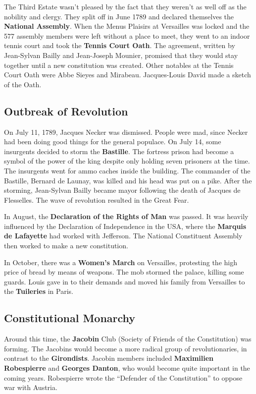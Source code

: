 The Third Estate wasn't pleased by the fact that they weren't as well off as the nobility and clergy.
They split off in June 1789 and declared themselves the \textbf{National Assembly}.
When the Menus Plaisirs at Versailles was locked and the 577 assembly members were left without a place to meet,
they went to an indoor tennis court and took the \textbf{Tennis Court Oath}.
The agreement, written by Jean-Sylvan Bailly and Jean-Joseph Mounier,
promised that they would stay together until a new constitution was created.
Other notables at the Tennis Court Oath were Abbe Sieyes and Mirabeau.
Jacques-Louis David made a sketch of the Oath.

\subsection*{Outbreak of Revolution}

On July 11, 1789, Jacques Necker was dismissed.
People were mad, since Necker had been doing good things for the general populace.
On July 14, some insurgents decided to storm the \textbf{Bastille}.
The fortress prison had become a symbol of the power of the king despite only holding seven prisoners at the time.
The insurgents went for ammo caches inside the building.
The commander of the Bastille, Bernard de Launay, was killed and his head was put on a pike.
After the storming, Jean-Sylvan Bailly became mayor following the death of Jacques de Flesselles.
The wave of revolution resulted in the Great Fear.

In August, the \textbf{Declaration of the Rights of Man} was passed.
It was heavily influenced by the Declaration of Independence in the USA,
where the \textbf{Marquis de Lafayette} had worked with Jefferson.
The National Constituent Assembly then worked to make a new constitution.

In October, there was a \textbf{Women's March} on Versailles,
protesting the high price of bread by means of weapons.
The mob stormed the palace, killing some guards.
Louis gave in to their demands and moved his family from Versailles to the \textbf{Tuileries} in Paris.

\subsection*{Constitutional Monarchy}

Around this time, the \textbf{Jacobin} Club (Society of Friends of the Constitution) was forming.
The Jacobins would become a more radical group of revolutionaries, in contrast to the \textbf{Girondists}.
Jacobin members included \textbf{Maximilien Robespierre} and \textbf{Georges Danton},
who would become quite important in the coming years.
Robespierre wrote the ``Defender of the Constitution'' to oppose war with Austria.

